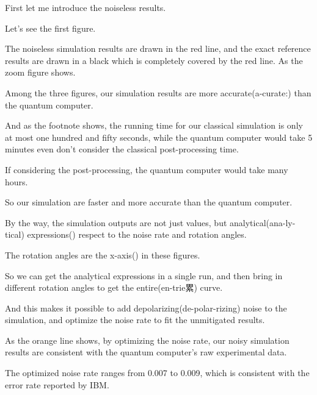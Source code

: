 \documentclass[10pt]{beamer}
\begin{document}
\begin{CJK}{UTF8}{gbsn}
{ First let me introduce the noiseless results.

Let's see the first figure.

 The noiseless simulation results are drawn in the red line, and the exact reference results are drawn in a black which is completely covered by the red line. As the zoom figure shows.

 Among the three figures, our simulation results are more accurate(a-curate:) than the quantum computer.

And as the footnote shows, the running time for our classical simulation is only at most one hundred and fifty seconds, while the quantum computer would take 5 minutes even don't consider the classical post-processing time.

If considering the post-processing, the quantum computer would take many hours.

So our simulation are faster and more accurate than the quantum computer.

 By the way, the simulation outputs are not just values, but analytical(ana-ly-tical) expressions() respect to the noise rate and rotation angles.

 The rotation angles are the x-axis() in these figures.

So we can get the analytical expressions in a single run, and then bring in different rotation angles to get the entire(en-trie累) curve.

 And this makes it possible to add depolarizing(de-polar-rizing) noise to the simulation, and optimize the noise rate to fit the unmitigated results.


 As the orange line shows, by optimizing the noise rate, our noisy simulation results are consistent with the quantum computer's raw experimental data.

 The optimized noise rate ranges from 0.007 to 0.009, which is consistent with the error rate reported by IBM.
}


\end{CJK}
\end{document}
